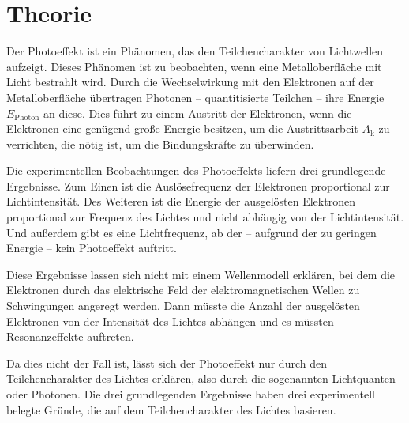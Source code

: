 \section{Theorie}
\label{sec:Theorie}

Der Photoeffekt ist ein Phänomen, das den Teilchencharakter von Lichtwellen aufzeigt.
Dieses Phänomen ist zu beobachten, wenn eine Metalloberfläche mit Licht bestrahlt wird. 
Durch die Wechselwirkung mit den Elektronen auf der Metalloberfläche übertragen  Photonen -- 
quantitisierte Teilchen -- ihre Energie $E_{\mathrm{Photon}}$ an diese. 
Dies führt zu einem Austritt der Elektronen, wenn die Elektronen eine genügend große Energie
besitzen, um die Austrittsarbeit $A_{\mathrm{k}}$ zu verrichten, die nötig ist, um die
Bindungskräfte zu überwinden. 

Die experimentellen Beobachtungen des Photoeffekts liefern drei grundlegende Ergebnisse.
Zum Einen ist die Auslösefrequenz der Elektronen proportional zur Lichtintensität.
Des Weiteren ist die Energie der ausgelösten Elektronen proportional zur Frequenz des Lichtes
und nicht abhängig von der Lichtintensität.
Und außerdem gibt es eine Lichtfrequenz, ab der -- aufgrund der zu geringen Energie -- kein 
Photoeffekt auftritt.

Diese Ergebnisse lassen sich nicht mit einem Wellenmodell erklären, bei dem die Elektronen 
durch das elektrische Feld der elektromagnetischen Wellen zu Schwingungen  angeregt werden.
Dann müsste die Anzahl der ausgelösten Elektronen von der Intensität des Lichtes abhängen 
und es müssten Resonanzeffekte auftreten.

Da dies nicht der Fall ist, lässt sich der Photoeffekt nur durch den Teilchencharakter des 
Lichtes erklären, also durch die sogenannten Lichtquanten oder Photonen.
Die drei grundlegenden Ergebnisse haben drei experimentell belegte Gründe, die auf dem 
Teilchencharakter des Lichtes basieren.

